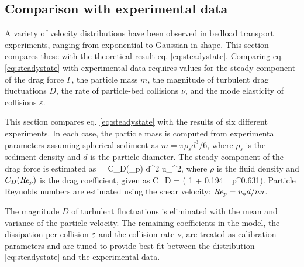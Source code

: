 \subsection{Comparison with experimental data}
\label{sec:langexperimentcomparison}

A variety of velocity distributions have been observed in bedload transport experiments, ranging from exponential to Gaussian in shape. 
This section compares these with the theoretical result eq. \ref{eq:steadystate}.
Comparing eq. \ref{eq:steadystate} with experimental data requires values for the steady component of the drag force $\Gamma$, the particle mass $m$, the magnitude of turbulent drag fluctuations $D$, the rate of particle-bed collisions $\nu$, and the mode elasticity of collisions $\varepsilon$.

This section compares eq. \ref{eq:steadystate} with the results of six different experiments.
In each case, the particle mass is computed from experimental parameters assuming spherical sediment as $m = \pi \rho_s d^3/6$, where $\rho_s$ is the sediment density and $d$ is the particle diameter. The steady component of the drag force is estimated as
\be \Gamma =  \rho C_D(\Rey_p) d^2 u_\ast^2,\ee
where $\rho$ is the fluid density and $C_D(\mbox{\textit{Re}}_p)$ is the drag coefficient, given as \citep{Clift1978,Gonzalez2017}
\be C_D = ( 1 + 0.194 \Rey_p^{0.631}). \ee
Particle Reynolds numbers are estimated using the shear velocity: $\mbox{\textit{Re}}_p= u_\ast d/nu$. 

The magnitude $D$ of turbulent fluctuations is eliminated with the mean and variance of the particle velocity. The remaining coefficients in the model, the dissipation per collision $\varepsilon$ and the collision rate $\nu$, are treated as calibration parameters and are tuned to provide best fit between the distribution \ref{eq:steadystate} and the experimental data.

